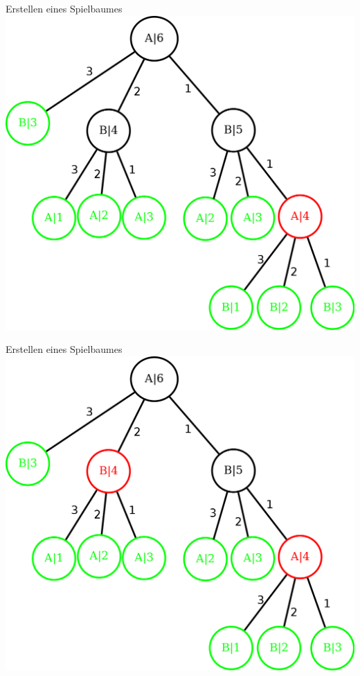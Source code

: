 \documentclass[18pt]{beamer}
\begin{document}
\begin{frame}{Erstellen eines Spielbaumes}
\includegraphics[scale=0.55]{baum5.png}
\end{frame}

\begin{frame}{Erstellen eines Spielbaumes}
\includegraphics[scale=0.55]{baum6.png}
\end{frame}
\end{document}
